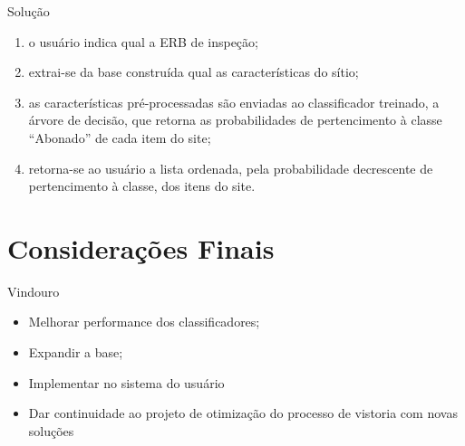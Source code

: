 \documentclass{beamer}
\begin{document}
\begin{frame}{Solu\c{c}ão}
  \begin{enumerate}
    \item	o usuário indica qual a ERB de inspeção;
\item extrai-se da base construída qual as características do sítio;
\item as características pré-processadas são enviadas ao classificador treinado,
  a árvore de decisão, que retorna as probabilidades de pertencimento à classe
  “Abonado” de cada item do site;

  \item retorna-se ao usuário a lista ordenada, pela probabilidade decrescente
    de pertencimento à classe, dos itens do site.
  \end{enumerate}
\end{frame}

\section{Considerações Finais}

\begin{frame}{Vindouro}
  \begin{itemize}
  \item Melhorar performance dos classificadores;
  \item Expandir a base;
  \item Implementar no sistema do usuário
  \item Dar continuidade ao projeto de otimiza\c{c}ão do processo de vistoria com novas solu\c{c}ões
  \end{itemize}
  
\end{frame}

\end{document}
